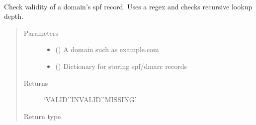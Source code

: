 \documentclass[a4paper,10pt,english,openany,oneside]{sphinxmanual}
\begin{document}
\begin{fulllineitems}
\label{\detokenize{functions:sdvalidator.validate_spf}}~
\begin{sphinxVerbatim}[commandchars=\\\{\}]
\end{sphinxVerbatim}

Check validity of a domain’s spf record.
Uses a regex and checks recursive lookup depth.
\begin{quote}\begin{description}
\item[{Parameters}] \leavevmode\begin{itemize}
\item {} 
 () \textendash{} A domain such as example.com

\item {} 
 () \textendash{} Dictionary for storing spf/dmarc records

\end{itemize}

\item[{Returns}] \leavevmode
‘VALID’\textbar{}’INVALID’\textbar{}’MISSING’

\item[{Return type}] \leavevmode
{}

\end{description}\end{quote}

\end{fulllineitems}

\end{document}
